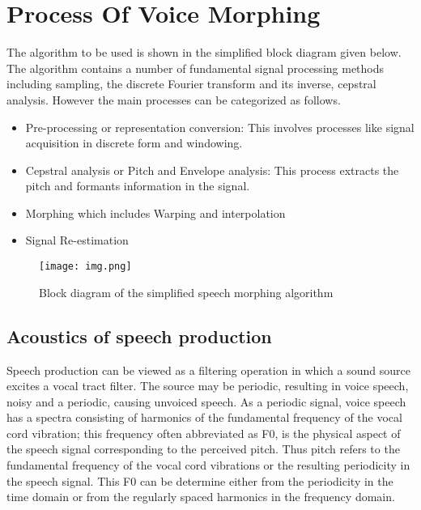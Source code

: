 \documentclass[12pt]{report}
\begin{document}
\section{Process Of Voice Morphing}
The algorithm to be used is shown in the simplified block diagram given below. The algorithm contains a number of fundamental signal processing methods including sampling, the discrete Fourier transform and its inverse, cepstral analysis. However the main processes can be categorized as follows.
\begin{itemize}
\item  Pre-processing  or  representation  conversion:  This  involves  processes  like  signal  acquisition  in discrete form and windowing. 
\item  Cepstral  analysis  or  Pitch  and  Envelope  analysis:  This  process  extracts  the  pitch  and  formants information in the signal.
\item  Morphing which includes Warping and interpolation
\item  Signal Re-estimation
\end{itemize}

\begin{figure}[h!]
\begin{center}
  \texttt{[image: img.png]}
  \caption{Block diagram of the simplified speech morphing algorithm}
  \label{fig:is}
\end{center}
\end{figure}

\subsection{ Acoustics of speech production}
Speech production can be viewed as a filtering operation in which a sound source excites a vocal tract filter. The source may be periodic, resulting in voice speech, noisy and a periodic, causing unvoiced speech. As a periodic signal, voice speech has a spectra consisting of harmonics of the fundamental frequency of the vocal  cord  vibration;  this  frequency  often  abbreviated  as  F0,  is  the  physical  aspect  of  the  speech  signal corresponding  to  the  perceived  pitch.  Thus  pitch  refers  to  the  fundamental  frequency  of  the  vocal  cord vibrations or the resulting periodicity in the speech signal. This F0 can be determine either from the periodicity in the time domain or from the regularly spaced harmonics in the frequency domain.
\newline
\end{document}

